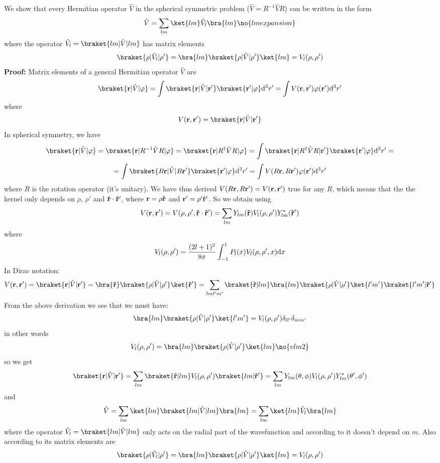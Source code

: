 We show that every Hermitian operator $\hat V$ in the spherical symmetric
problem ($\hat V=R^{-1}\hat VR$) can be written in the form
$$\hat V=\sum_{lm}\ket{lm}\hat V_l\bra{lm}\no{lmexpansion}$$
where the operator $\hat V_l=\braket{lm|\hat V|lm}$ has matrix elements
$$\braket{\rho|\hat V_l|\rho'}=\bra{lm}\braket{\rho|\hat V|\rho'}\ket{lm}=
V_l(\rho,\rho')$$
{\bf Proof:} Matrix elements of a general Hermitian operator $\hat V$ are
$$\braket{{\bf r}|\hat V|\varphi}=
\int\braket{{\bf r}|\hat V|{\bf r'}}\braket{{\bf r'}|\varphi}\d^3r'=
\int V({\bf r},{\bf r'})\varphi({\bf r'})\d^3r'$$
where
$$V({\bf r}, {\bf r'})=\braket{{\bf r}|\hat V|{\bf r'}}$$ 
In spherical symmetry, we have 
$$\braket{{\bf r}|\hat V|\varphi}
=\braket{{\bf r}|R^{-1}\hat VR|\varphi}
=\braket{{\bf r}|R^{\dagger}\hat VR|\varphi}
=\int\braket{{\bf r}|R^{\dagger}\hat VR|{\bf r'}}\braket{{\bf r'}|\varphi}\d^3r'
=
$$
$$
=\int\braket{R{\bf r}|\hat V|R{\bf r'}}\braket{{\bf r'}|\varphi}\d^3r'
=\int V(R{\bf r},R{\bf r'})\varphi({\bf r'})\d^3r'
$$
where $R$ is the rotation operator (it's unitary). We have thus derived
$V(R{\bf r},R{\bf r'})=V({\bf r},{\bf r'})$ true for any $R$, which means that
the
the kernel only depends on $\rho$, $\rho'$ and 
${\bf\hat r}\cdot{\bf\hat r'}$, where ${\bf r}=\rho{\bf\hat r}$ and
${\bf r'}=\rho'{\bf\hat r'}$. So we obtain using 
$$V({\bf r}, {\bf r'})=V(\rho,\rho',{\bf\hat r}\cdot{\bf\hat r'})=
\sum_{lm}  Y_{lm}({\bf\hat r}) V_l(\rho,\rho')
Y_{lm}^*({\bf\hat r'})$$
where
$$V_l(\rho,\rho')={(2l+1)^2\over8\pi}\int_{-1}^1 P_l(x)V_l(\rho,\rho',x){\rm d} x$$
In Dirac notation:
$$V({\bf r}, {\bf r'})=\braket{{\bf r}|\hat V|{\bf r'}}
=\bra{\bf\hat r}\braket{\rho|\hat V|\rho'}\ket{\bf\hat r'}
=\sum_{lml'm'}\braket{{\bf\hat r}|lm}\bra{lm}\braket{\rho|\hat V|\rho'}
\ket{l'm'}\braket{l'm'|\bf\hat r'}
$$
From the above derivation we see that we must have:
$$\bra{lm}\braket{\rho|\hat V|\rho'}\ket{l'm'}=
V_l(\rho,\rho')\delta_{ll'}\delta_{mm'}$$
in other words
$$V_l(\rho,\rho')=\bra{lm}\braket{\rho|\hat V|\rho'}\ket{lm} \no{vlm2}$$
so we get
$$\braket{{\bf r}|\hat V|{\bf r'}}
=\sum_{lm}\braket{{\bf\hat r}|lm}V_l(\rho,\rho')\braket{lm|\bf\hat r'}
=\sum_{lm}Y_{lm}(\theta,\phi) V_l(\rho,\rho') Y_{lm}^*(\theta',\phi')
$$
and
$$\hat V 
=\sum_{lm}\ket{lm}\braket{lm|\hat V|lm}\bra{lm} 
=\sum_{lm}\ket{lm}\hat V_l\bra{lm} 
$$
where the operator $\hat V_l=\braket{lm|\hat V|lm}$ only acts on the radial
part of the wavefunction and according to  it doesn't depend on
$m$. Also according to  its matrix elements are
$$\braket{\rho|\hat V_l|\rho'}=\bra{lm}\braket{\rho|\hat V|\rho'}\ket{lm}=
V_l(\rho,\rho')$$


